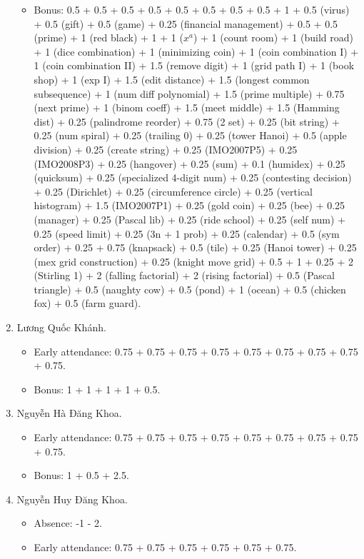 \documentclass{article}
\begin{document}
\begin{enumerate}
\begin{itemize}
		\item Bonus: 0.5 + 0.5 + 0.5 + 0.5 + 0.5 + 0.5 + 0.5 + 0.5 + 1 + 0.5 (virus) + 0.5 (gift) + 0.5 (game) + 0.25 (financial management) + 0.5 + 0.5 (prime) + 1 (red black) + 1 + 1 ($x^a$) + 1 (count room) + 1 (build road) + 1 (dice combination) + 1 (minimizing coin) + 1 (coin combination I) + 1 (coin combination II) + 1.5 (remove digit) + 1 (grid path I) + 1 (book shop) + 1 (exp I) + 1.5 (edit distance) + 1.5 (longest common subsequence) + 1 (num diff polynomial) + 1.5 (prime multiple) + 0.75 (next prime) + 1 (binom coeff) + 1.5 (meet middle) + 1.5 (Hamming dist) + 0.25 (palindrome reorder) + 0.75 (2 set) + 0.25 (bit string) + 0.25 (num spiral) + 0.25 (trailing 0) + 0.25 (tower Hanoi) + 0.5 (apple division) + 0.25 (create string) + 0.25 (IMO2007P5) + 0.25 (IMO2008P3) + 0.25 (hangover) + 0.25 (sum) + 0.1 (humidex) + 0.25 (quicksum) + 0.25 (specialized 4-digit num) + 0.25 (contesting decision) + 0.25 (Dirichlet) + 0.25 (circumference circle) + 0.25 (vertical histogram) + 1.5 (IMO2007P1) + 0.25 (gold coin) + 0.25 (bee) + 0.25 (manager) + 0.25 (Pascal lib) + 0.25 (ride school) + 0.25 (self num) + 0.25 (speed limit) + 0.25 (3n + 1 prob) + 0.25 (calendar) + 0.5 (sym order) + 0.25 + 0.75 (knapsack) + 0.5 (tile) + 0.25 (Hanoi tower) + 0.25 (mex grid construction) + 0.25 (knight move grid) + 0.5 + 1 + 0.25 + 2 (Stirling 1) + 2 (falling factorial) + 2 (rising factorial) + 0.5 (Pascal triangle) + 0.5 (naughty cow) + 0.5 (pond) + 1 (ocean) + 0.5 (chicken fox) + 0.5 (farm guard).
	\end{itemize}
	\item {\sc Lương Quốc Khánh.}
	\begin{itemize}
		\item Early attendance: 0.75 + 0.75 + 0.75 + 0.75 + 0.75 + 0.75 + 0.75 + 0.75 + 0.75.
		\item Bonus: 1 + 1 + 1 + 1 + 0.5.
	\end{itemize}
	\item {\sc Nguyễn Hà Đăng Khoa.}
	\begin{itemize}
		\item Early attendance: 0.75 + 0.75 + 0.75 + 0.75 + 0.75 + 0.75 + 0.75 + 0.75 + 0.75.
		\item Bonus: 1 + 0.5 + 2.5.
	\end{itemize}
	\item {\sc Nguyễn Huy Đăng Khoa.}
	\begin{itemize}
		\item Absence: -1 - 2.
		\item Early attendance: 0.75 + 0.75 + 0.75 + 0.75 + 0.75 + 0.75.

\end{itemize}
\end{enumerate}
\end{document}
